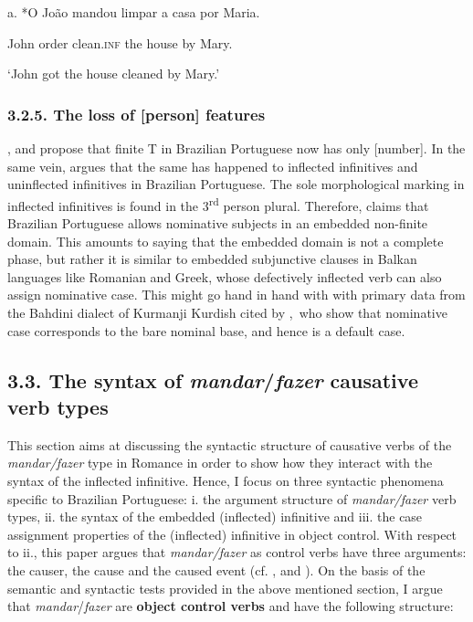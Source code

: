 \documentclass[output=paper]{langsci/langscibook}
\begin{document}
          a.  *O João mandou limpar      a   casa    por Maria.

    John       order     clean.\textsc{inf} the house by  Mary.

    ‘John got the house cleaned by Mary.’

\subsubsection{ 3.2.5. The loss of [person] features}

\citet{Nunes2008}, \citet{Ferreira2009} and \citet{Rodrigues2004} propose that finite T in Brazilian Portuguese now has only [number]. In the same vein, \citet{Cyrino2010} argues that the same has happened to inflected infinitives and uninflected infinitives in Brazilian Portuguese. The sole morphological marking in inflected infinitives is found in the 3\textsuperscript{rd} person plural. Therefore, \citet{Cyrino2010} claims that Brazilian Portuguese allows nominative subjects in an embedded non-finite domain. This amounts to saying that the embedded domain is not a complete phase, but rather it is similar to embedded subjunctive clauses in Balkan languages like Romanian and Greek, whose defectively inflected verb can also assign nominative case. This might go hand in hand with with primary data from the Bahdini dialect of Kurmanji Kurdish cited by \citet{ManziniEtAl2015},~who show that nominative case corresponds to the bare nominal base, and hence is a default case.  

\subsection{ 3.3. The syntax of \textit{mandar}/\textit{fazer} causative verb types}

This section aims at discussing the syntactic structure of causative verbs of the \textit{mandar/fazer} type in Romance in order to show how they interact with the syntax of the inflected infinitive.\textbf{ }Hence, I focus on three syntactic phenomena specific to Brazilian Portuguese: i. the argument structure of \textit{mandar/fazer}\textbf{ }verb types, ii. the syntax of the embedded (inflected) infinitive and iii.\textbf{ }the case assignment properties of the (inflected) infinitive in object control. With respect to ii., this paper argues that \textit{mandar/fazer} as control verbs have three arguments: the causer, the cause and the caused event (cf. \citealt{Zubizarreta1985}, \citealt{Alsina1992} and \citealt{Ippolito2000}). On the basis of the semantic and syntactic tests provided in the above mentioned section, I argue that \textit{mandar}/\textit{fazer} are \textbf{object control verbs} and have the following structure:
\end{document}

